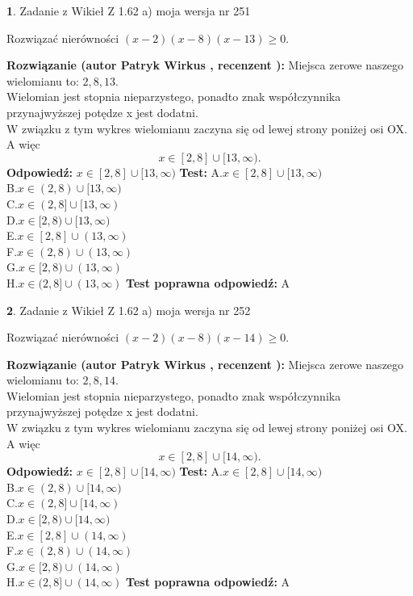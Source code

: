 \documentclass[12pt, a4paper]{article}
\theoremstyle{definition} %
\newtheorem{zad}{}
\newcommand{\zadStart}[1]{\begin{zad}#1\newline}
\newcommand{\zadStop}{\end{zad}}
\newcommand{\rozwStart}[2]{\noindent \textbf{Rozwiązanie (autor #1 , recenzent #2): }\newline}
\newcommand{\rozwStop}{\newline}
\newcommand{\odpStart}{\noindent \textbf{Odpowiedź:}\newline}
\newcommand{\odpStop}{\newline}
\newcommand{\testStart}{\noindent \textbf{Test:}\newline}
\newcommand{\testStop}{\newline}
\newcommand{\kluczStart}{\noindent \textbf{Test poprawna odpowiedź:}\newline}
\newcommand{\kluczStop}{\newline}
\begin{document}
\zadStart{Zadanie z Wikieł Z 1.62 a) moja wersja nr 251}

Rozwiązać nierówności $(x-2)(x-8)(x-13)\ge0$.
\zadStop
\rozwStart{Patryk Wirkus}{}
Miejsca zerowe naszego wielomianu to: $2, 8, 13$.\\
Wielomian jest stopnia nieparzystego, ponadto znak współczynnika przy\linebreak najwyższej potędze x jest dodatni.\\ W związku z tym wykres wielomianu zaczyna się od lewej strony poniżej osi OX. A więc $$x \in [2,8] \cup [13,\infty).$$
\rozwStop
\odpStart
$x \in [2,8] \cup [13,\infty)$
\odpStop
\testStart
A.$x \in [2,8] \cup [13,\infty)$\\
B.$x \in (2,8) \cup [13,\infty)$\\
C.$x \in (2,8] \cup [13,\infty)$\\
D.$x \in [2,8) \cup [13,\infty)$\\
E.$x \in [2,8] \cup (13,\infty)$\\
F.$x \in (2,8) \cup (13,\infty)$\\
G.$x \in [2,8) \cup (13,\infty)$\\
H.$x \in (2,8] \cup (13,\infty)$
\testStop
\kluczStart
A
\kluczStop



\zadStart{Zadanie z Wikieł Z 1.62 a) moja wersja nr 252}

Rozwiązać nierówności $(x-2)(x-8)(x-14)\ge0$.
\zadStop
\rozwStart{Patryk Wirkus}{}
Miejsca zerowe naszego wielomianu to: $2, 8, 14$.\\
Wielomian jest stopnia nieparzystego, ponadto znak współczynnika przy\linebreak najwyższej potędze x jest dodatni.\\ W związku z tym wykres wielomianu zaczyna się od lewej strony poniżej osi OX. A więc $$x \in [2,8] \cup [14,\infty).$$
\rozwStop
\odpStart
$x \in [2,8] \cup [14,\infty)$
\odpStop
\testStart
A.$x \in [2,8] \cup [14,\infty)$\\
B.$x \in (2,8) \cup [14,\infty)$\\
C.$x \in (2,8] \cup [14,\infty)$\\
D.$x \in [2,8) \cup [14,\infty)$\\
E.$x \in [2,8] \cup (14,\infty)$\\
F.$x \in (2,8) \cup (14,\infty)$\\
G.$x \in [2,8) \cup (14,\infty)$\\
H.$x \in (2,8] \cup (14,\infty)$
\testStop
\kluczStart
A
\kluczStop
\end{document}
